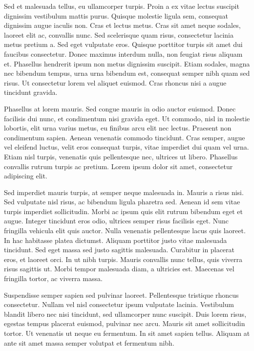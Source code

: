 \documentclass[final]{durchemreport}
\begin{document}
Sed et malesuada tellus, eu ullamcorper turpis. Proin a ex vitae lectus suscipit dignissim vestibulum mattis purus. Quisque molestie ligula sem, consequat dignissim augue iaculis non. Cras et lectus metus. Cras sit amet neque sodales, laoreet elit ac, convallis nunc. Sed scelerisque quam risus, consectetur lacinia metus pretium a. Sed eget vulputate eros. Quisque porttitor turpis sit amet dui faucibus consectetur. Donec maximus interdum nulla, non feugiat risus aliquam et. Phasellus hendrerit ipsum non metus dignissim suscipit. Etiam sodales, magna nec bibendum tempus, urna urna bibendum est, consequat semper nibh quam sed risus. Ut consectetur lorem vel aliquet euismod. Cras rhoncus nisi a augue tincidunt gravida.

Phasellus at lorem mauris. Sed congue mauris in odio auctor euismod. Donec facilisis dui nunc, et condimentum nisi gravida eget. Ut commodo, nisl in molestie lobortis, elit urna varius metus, eu finibus arcu elit nec lectus. Praesent non condimentum sapien. Aenean venenatis commodo tincidunt. Cras semper, augue vel eleifend luctus, velit eros consequat turpis, vitae imperdiet dui quam vel urna. Etiam nisl turpis, venenatis quis pellentesque nec, ultrices ut libero. Phasellus convallis rutrum turpis ac pretium. Lorem ipsum dolor sit amet, consectetur adipiscing elit.

Sed imperdiet mauris turpis, at semper neque malesuada in. Mauris a risus nisi. Sed vulputate nisl risus, ac bibendum ligula pharetra sed. Aenean id sem vitae turpis imperdiet sollicitudin. Morbi ac ipsum quis elit rutrum bibendum eget et augue. Integer tincidunt eros odio, ultrices semper risus facilisis eget. Nunc fringilla vehicula elit quis auctor. Nulla venenatis pellentesque lacus quis laoreet. In hac habitasse platea dictumst. Aliquam porttitor justo vitae malesuada tincidunt. Sed eget massa sed justo sagittis malesuada. Curabitur in placerat eros, et laoreet orci. In ut nibh turpis. Mauris convallis nunc tellus, quis viverra risus sagittis ut. Morbi tempor malesuada diam, a ultricies est. Maecenas vel fringilla tortor, ac viverra massa.

Suspendisse semper sapien sed pulvinar laoreet. Pellentesque tristique rhoncus consectetur. Nullam vel nisl consectetur ipsum vulputate lacinia. Vestibulum blandit libero nec nisi tincidunt, sed ullamcorper nunc suscipit. Duis lorem risus, egestas tempus placerat euismod, pulvinar nec arcu. Mauris sit amet sollicitudin tortor. Ut venenatis ut neque eu fermentum. In sit amet sapien tellus. Aliquam at ante sit amet massa semper volutpat et fermentum nibh.
\end{document}
